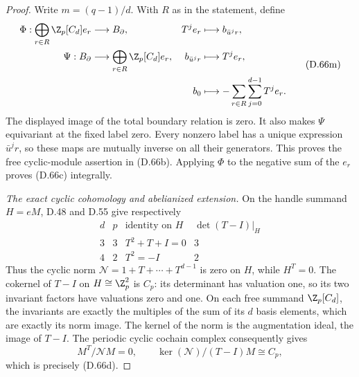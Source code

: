 \begin{proof}
Write $m=(q-1)/d$. With $R$ as in the statement, define
\[
 \begin{aligned}
 \Phi:\bigoplus_{r\in R}\Z_p[C_d]e_r&\longrightarrow B_\partial,
                    &T^j e_r&\longmapsto b_{\bar u^j r},\\
 \Psi:B_\partial&\longrightarrow
                         \bigoplus_{r\in R}\Z_p[C_d]e_r,
                    &b_{\bar u^j r}&\longmapsto T^j e_r,\\
                    &&b_0&\longmapsto
                         -\sum_{r\in R}\sum_{j=0}^{d-1}T^j e_r.
 \end{aligned}                                               \tag{D.66m}
\]
The displayed image of the total boundary relation is zero.
It also makes $\Psi$ equivariant at the fixed label zero.
Every nonzero label has a unique expression $\bar u^j r$,
so these maps are mutually inverse on all their generators.
This proves the free cyclic-module assertion in (D.66b).
Applying $\Phi$ to the negative sum of the $e_r$ proves
(D.66c) integrally.

\emph{The exact cyclic cohomology and abelianized extension.}
On the handle summand $H=eM$, D.48 and D.55 give respectively
\[
 \begin{array}{c|c|c|c}
 d&p&\text{identity on }H&\det(T-I)|_H\\ \hline
 3&3&T^2+T+I=0&3\\
 4&2&T^2=-I&2
 \end{array}                                                   \tag{D.66n}
\]
Thus the cyclic norm $\mathcal N=1+T+\cdots+T^{d-1}$ is
zero on $H$, while $H^T=0$. The cokernel of $T-I$ on
$H\cong\Z_p^2$ is $C_p$: its determinant has valuation one,
so its two invariant factors have valuations zero and one.
On each free summand $\Z_p[C_d]$, the invariants are
exactly the multiples of the sum of its $d$ basis elements,
which are exactly its norm image. The kernel of the norm
is the augmentation ideal, the image of $T-I$.
The periodic cyclic cochain complex consequently gives
\[
 M^T/\mathcal N M=0,\qquad
 \ker(\mathcal N)/(T-I)M\cong C_p,
\]
which is precisely (D.66d).


\end{proof}
